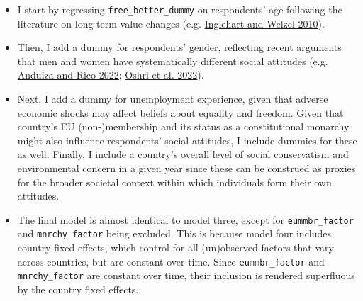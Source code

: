 \documentclass[
]{article}
\begin{document}
\begin{itemize}
\item
  I start by regressing \texttt{free\_better\_dummy} on respondents' age
  following the literature on long-term value changes (e.g.
  \protect\hyperlink{ref-inglehart2010changing}{Inglehart and Welzel
  2010}).
\item
  Then, I add a dummy for respondents' gender, reflecting recent
  arguments that men and women have systematically different social
  attitudes (e.g. \protect\hyperlink{ref-anduiza2022sexism}{Anduiza and
  Rico 2022}; \protect\hyperlink{ref-oshri2022risk}{Oshri et al. 2022}).
\item
  Next, I add a dummy for unemployment experience, given that adverse
  economic shocks may affect beliefs about equality and freedom. Given
  that country's EU (non-)membership and its status as a constitutional
  monarchy might also influence respondents' social attitudes, I include
  dummies for these as well. Finally, I include a country's overall
  level of social conservatism and environmental concern in a given year
  since these can be construed as proxies for the broader societal
  context within which individuals form their own attitudes.
\item
  The final model is almost identical to model three, except for
  \texttt{eummbr\_factor} and \texttt{mnrchy\_factor} being excluded.
  This is because model four includes country fixed effects, which
  control for all (un)observed factors that vary across countries, but
  are constant over time. Since \texttt{eummbr\_factor} and
  \texttt{mnrchy\_factor} are constant over time, their inclusion is
  rendered superfluous by the country fixed effects.
\end{itemize}
\end{document}
